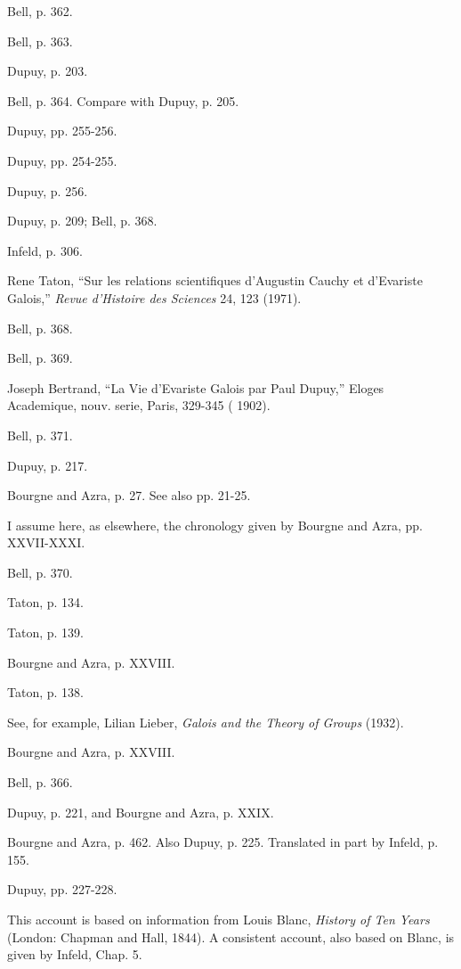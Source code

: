 \documentclass[12pt]{article}
\begin{document}
\begin{thebibliography}{9999}
 Bell, p. 362. 

 Bell, p. 363. 

 Dupuy, p. 203. 

 Bell, p. 364. Compare with Dupuy, p. 205. 

 Dupuy, pp. 255-256. 

 Dupuy, pp. 254-255. 

 Dupuy, p. 256. 

 Dupuy, p. 209; Bell, p. 368. 

 Infeld, p. 306. 

 Rene Taton, ``Sur les relations scientifiques d'Augustin Cauchy et d'Evariste Galois,'' \emph{Revue d'Histoire des
Sciences} 24, 123 (1971). 

 Bell, p. 368. 

 Bell, p. 369. 

 Joseph Bertrand, ``La Vie d'Evariste Galois par Paul Dupuy,'' Eloges Academique, nouv. serie, Paris, 329-345 (
1902). 

 Bell, p. 371. 

 Dupuy, p. 217. 

 Bourgne and Azra, p. 27. See also pp. 21-25. 

 I assume here, as elsewhere, the chronology given by Bourgne and Azra, pp. XXVII-XXXI. 

 Bell, p. 370. 

 Taton, p. 134. 

 Taton, p. 139. 

 Bourgne and Azra, p. XXVIII. 

 Taton, p. 138. 

 See, for example, Lilian Lieber, \emph{Galois and the Theory of Groups} (1932).

 Bourgne and Azra, p. XXVIII. 

 Bell, p. 366. 

 Dupuy, p. 221, and Bourgne and Azra, p. XXIX.

 Bourgne and Azra, p. 462. Also Dupuy, p. 225. Translated in part by Infeld, p. 155. 

 Dupuy, pp. 227-228. 

 This account is based on information from Louis Blanc, \emph{History of Ten Years} (London: Chapman and Hall, 1844). A
consistent account, also based on Blanc, is given by Infeld, Chap. 5. 


\end{thebibliography}
\end{document}
